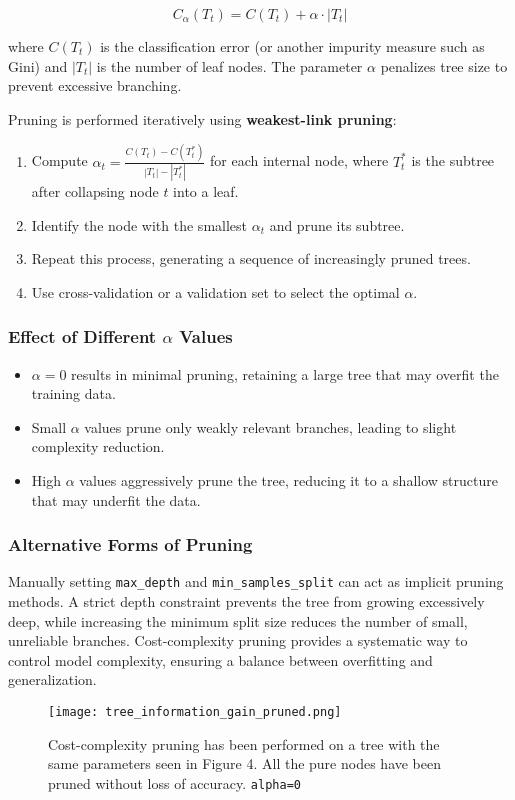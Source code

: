 \documentclass[12pt]{article}
\begin{document}
\begin{equation}
    C_\alpha(T_t) = C(T_t) + \alpha \cdot |T_t|
\end{equation}

where $C(T_t)$ is the classification error (or another impurity measure such as Gini) and $|T_t|$ is the number of leaf nodes. The parameter $\alpha$ penalizes tree size to prevent excessive branching.

Pruning is performed iteratively using \textbf{weakest-link pruning}:
\begin{enumerate}
    \item Compute $\alpha_t = \frac{C(T_t) - C(T_t^*)}{|T_t| - |T_t^*|}$ for each internal node, where $T_t^*$ is the subtree after collapsing node $t$ into a leaf.
    \item Identify the node with the smallest $\alpha_t$ and prune its subtree.
    \item Repeat this process, generating a sequence of increasingly pruned trees.
    \item Use cross-validation or a validation set to select the optimal $\alpha$.
\end{enumerate}

\subsubsection{Effect of Different $\alpha$ Values}
\begin{itemize}
    \item $\alpha = 0$ results in minimal pruning, retaining a large tree that may overfit the training data.
    \item Small $\alpha$ values prune only weakly relevant branches, leading to slight complexity reduction.
    \item High $\alpha$ values aggressively prune the tree, reducing it to a shallow structure that may underfit the data.
\end{itemize}

\subsubsection{Alternative Forms of Pruning}
Manually setting \texttt{max\_depth} and \texttt{min\_samples\_split} can act as implicit pruning methods. A strict depth constraint prevents the tree from growing excessively deep, while increasing the minimum split size reduces the number of small, unreliable branches.
Cost-complexity pruning provides a systematic way to control model complexity, ensuring a balance between overfitting and generalization.
\begin{figure}
    \centering
    \texttt{[image: tree\_information\_gain\_pruned.png]}
    \caption{Cost-complexity pruning has been performed on a tree with the same parameters seen in Figure 4. All the pure nodes have been pruned without loss of accuracy. \texttt{alpha=0}}
    \label{fig:enter-label}
\end{figure}
\end{document}

